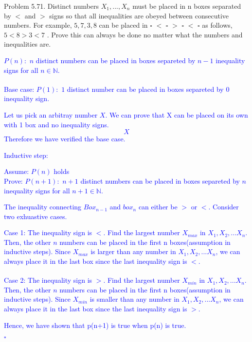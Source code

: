 \documentclass{article}
\begin{document}
\begin{addmargin}[2em]{2em}
Problem 5.71.  Distinct numbers $X_1,...,X_n$ must be placed in n boxes separated by $<$ and $>$ signs so that all inequalities are obeyed between consecutive numbers. For example, $5,7,3,8$ can be placed in $\square$ $<$ $\square$ $>$ $\square$ $<$ $\square$ as follows, $5 < 8 > 3 < 7$ . Prove this can always be done no matter what the numbers and inequalities are.

	\textcolor{blue}{
	\begin{addmargin}[2em]{1em}
		$P(n):$ $n$ distinct numbers can be placed in boxes separeted by $n-1$ inequality signs for all $n \in \mathbb{N}.$\\\\
		Base case: $P(1):$ $1$ distinct number can be placed in boxes separeted by $0$ inequality sign.\\
		\begin{addmargin}[1.7cm]{0cm}
			Let us pick an arbitray number $X$. We can prove that X can be placed on its own with 1 box and no inequality signs.
			$$X$$
			Therefore we have verified the base case.\\
		\end{addmargin}
		Inductive step: 
		\begin{addmargin}[2.35cm]{0cm}
			Assume: $P(n)$ holds\\
			Prove: $P(n+1):$ $n+1$ distinct numbers can be placed in boxes separeted by $n$ inequality signs for all $n+1 \in \mathbb{N}.$\\
			\begin{addmargin}[0cm]{0cm}
				The inequality connecting $Box_{n-1}$ and $box_{n}$ can either be $>$ or $<$. Consider two exhuastive cases.
				\begin{addmargin}[1.5cm]{0cm}
					Case 1: The inequality sign is $<$. Find the largest number $X_{max}$ in $X_1,X_2,...X_n$. Then, the other $n$ numbers can be placed in the first n boxes(assumption in inductive steps). Since $X_{max}$ is larger than any number in $X_1,X_2,...X_n$, we can always place it in the last box since the last inequality sign is $<$.\\\\
					Case 2: The inequality sign is $>$. Find the largest number $X_{min}$ in $X_1,X_2,...X_n$. Then, the other $n$ numbers can be placed in the first n boxes(assumption in inductive steps). Since $X_{min}$ is smaller than any number in $X_1,X_2,...X_n$, we can always place it in the last box since the last inequality sign is $>$.\\
				\end{addmargin}
				Hence, we have shown that p(n+1) is true when p(n) is true.
			\end{addmargin}
		\end{addmargin}
		\begin{flushright}
			$\square$
		\end{flushright}
	\end{addmargin}
}
\end{addmargin}
\end{document}
